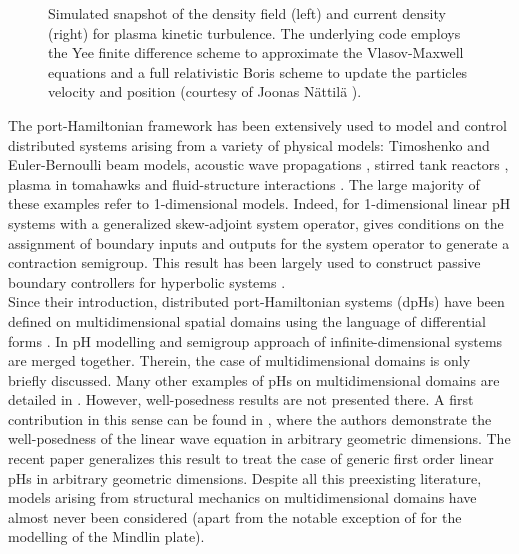\begin{figure}[htbp]%
	\centering
	\hspace{8pt}%
	\caption[]{Simulated snapshot of the density field (left) and current density (right) for plasma kinetic turbulence. The underlying code employs the Yee finite difference scheme \cite{yee1966numerical} to approximate the Vlasov-Maxwell equations and a full relativistic Boris scheme \cite{boris1970relativistic} to update the particles velocity and position (courtesy of Joonas N\"attil\"a \cite{nattila2019runko}).}%
	\label{fig:plasma}%
\end{figure}

The port-Hamiltonian framework has been extensively used to model and control distributed systems arising from a variety of physical models: Timoshenko \cite{macchelli2004timo} and Euler-Bernoulli  \cite{aoues2017modeling} beam models, acoustic wave propagations \cite{trenchant2018}, stirred tank reactors \cite{ramirez2013irreversible},  plasma in tomahawks \cite{vu2016plasma} and fluid-structure interactions \cite{cardoso2017}. The large majority of these examples refer to 1-dimensional models. Indeed, for 1-dimensional linear pH systems with a generalized skew-adjoint system operator, \cite{legorrec2005} gives conditions on the assignment of boundary inputs and outputs for the system operator to generate a contraction semigroup. This result has been largely used to construct passive boundary controllers for hyperbolic systems \cite{villegas2009exponential,macchelli2016synthesis,macchelli2020exponential}. \\

Since their introduction, distributed port-Hamiltonian systems (dpHs) have been defined on multidimensional spatial domains using the language of differential forms \cite{vanderschaft2002}. In \cite{villegas2007} pH  modelling and semigroup approach of infinite-dimensional systems are merged together. Therein, the  case of multidimensional domains is only briefly discussed. Many other examples of pHs on multidimensional domains are detailed in \cite[Chapter 4]{duindam2009}. However, well-posedness results are not presented there. A first contribution in this sense can be found in \cite{zwart2015wave}, where the authors demonstrate the well-posedness of the linear wave equation in arbitrary geometric dimensions. The recent paper  \cite{skrepek2019wellposedness} generalizes this result to treat the case of generic first order linear pHs in arbitrary geometric dimensions. Despite all this preexisting literature, models arising from structural mechanics on multidimensional domains have almost never been considered (apart from the notable exception of \cite{macchelli2005mindlin} for the modelling of the Mindlin plate).  \\

